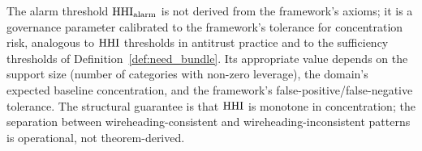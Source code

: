 \begin{remark}
\label{rem:hhi_alarm_governance}
The alarm threshold $\mathrm{HHI}_{\mathrm{alarm}}$ is not derived from
the framework's axioms; it is a governance parameter calibrated
to the framework's tolerance for concentration risk, analogous
to $\mathrm{HHI}$ thresholds in antitrust practice and to the sufficiency
thresholds of Definition~\ref{def:need_bundle}.  Its appropriate
value depends on the support size (number of categories with
non-zero leverage), the domain's expected baseline concentration,
and the framework's false-positive/false-negative tolerance.
The structural guarantee is that $\mathrm{HHI}$ is monotone in
concentration; the separation between wireheading-consistent and
wireheading-inconsistent patterns is operational, not
theorem-derived.
\end{remark}

